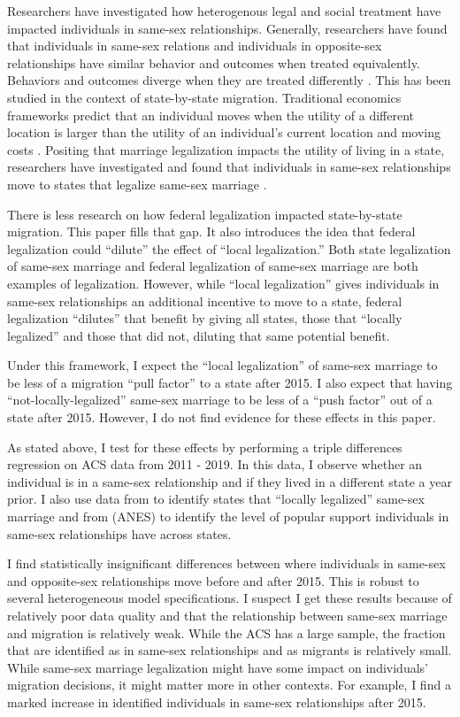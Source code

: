\documentclass[12pt,letterpaper]{article}
\begin{document}
Researchers have investigated how heterogenous legal and social treatment have impacted individuals in same-sex relationships. Generally, researchers have found that individuals in same-sex relations and individuals in opposite-sex relationships have similar behavior and outcomes when treated equivalently. Behaviors and outcomes diverge when they are treated differently \citep{2}. This has been studied in the context of state-by-state migration. Traditional economics frameworks predict that an individual moves when the utility of a different location is larger than the utility of an individual’s current location and moving costs \citep{12, 8}. Positing that marriage legalization impacts the utility of living in a state, researchers have investigated and found that individuals in same-sex relationships move to states that legalize same-sex marriage \citep{1, 12}. 

There is less research on how federal legalization impacted state-by-state migration. This paper fills that gap. It also introduces the idea that federal legalization could “dilute” the effect of “local legalization.” Both state legalization of same-sex marriage and federal legalization of same-sex marriage are both examples of legalization. However, while “local legalization” gives individuals in same-sex relationships an additional incentive to move to a state, federal legalization “dilutes” that benefit by giving all states, those that “locally legalized” and those that did not, diluting that same potential benefit. 

Under this framework, I expect the “local legalization” of same-sex marriage to be less of a migration “pull factor” to a state after 2015. I also expect that having “not-locally-legalized” same-sex marriage to be less of a “push factor” out of a state after 2015. However, I do not find evidence for these effects in this paper.

As stated above, I test for these effects by performing a triple differences regression on ACS data from 2011 - 2019. In this data, I observe whether an individual is in a same-sex relationship and if they lived in a different state a year prior. I also use data from \citet{1} to identify states that “locally legalized” same-sex marriage and from (ANES)  to identify the level of popular support individuals in same-sex relationships have across states.

I find statistically insignificant differences between where individuals in same-sex and opposite-sex relationships move before and after 2015. This is robust to several heterogeneous model specifications. I suspect I get these results because of relatively poor data quality and that the relationship between same-sex marriage and migration is relatively weak. While the ACS has a large sample, the fraction that are identified as in same-sex relationships and as migrants is relatively small. While same-sex marriage legalization might have some impact on individuals’ migration decisions, it might matter more in other contexts. For example, I find a marked increase in identified individuals in same-sex relationships after 2015. 
\end{document}
